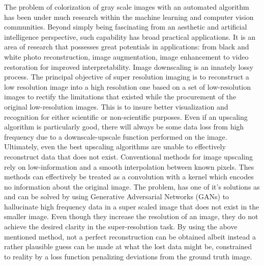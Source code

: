 \documentclass{article} %
\begin{document}
The problem of colorization of gray scale images with an automated algorithm has been under much research within the machine learning and computer vision communities. Beyond simply being fascinating from an aesthetic and artificial intelligence perspective, such capability has broad practical applications. It is an area of research that possesses great potentials in applications: from black and white photo reconstruction, image augmentation, image enhancement to video restoration for improved interpretability. 
    Image downscaling is an innately lossy process. The principal objective of super resolution imaging is to reconstruct a low resolution image into a high resolution one based on a set of low-resolution images to rectify the limitations that existed while the procurement of the original low-resolution images. This is to insure better visualization and recognition for either scientific or non-scientific purposes. Even if an upscaling algorithm is particularly good, there will always be some data loss from high frequency due to a downscale-upscale function performed on the image. Ultimately, even the best upscaling algorithms are unable to effectively reconstruct data that does not exist. Conventional methods for image upscaling rely on low-information and a smooth interpolation between known pixels. Thes methods can effectively be treated as a convolution with a kernel which encodes no information about the original image. The problem, has one of it's solutions as and can be solved by using Generative Adversarial Networks (GANs) to hallucinate high frequency data in a super scaled image that does not exist in the smaller image. Even though they increase the resolution of an image, they do not achieve the desired clarity in the super-resolution task. By using the above mentioned method, not a perfect reconstruction can be obtained albeit instead a rather plausible guess can be made at what the lost data might be, constrained to reality by a loss function penalizing deviations from the ground truth image.\\ 
\end{document}

